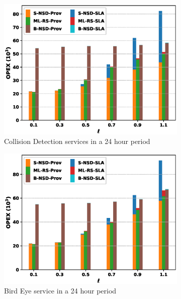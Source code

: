 \documentclass[conference, final]{IEEEtran}
\begin{document}
{\begin{figure}
\begin{subfigure}[h]{0.32\linewidth}
\includegraphics[width=\linewidth]{./figures/Automative-bar.eps}
\caption{Collision Detection services in a 24 hour period}
\end{subfigure}
\hfill
\begin{subfigure}[h]{0.32\linewidth}
\includegraphics[width=\linewidth]{./figures/bird_eye-bar.eps}
\caption{Bird Eye service in a 24 hour period}
\end{subfigure}
\hfill
\begin{subfigure}[h]{0.32\linewidth}

\end{subfigure}
\end{figure}}
\end{document}
